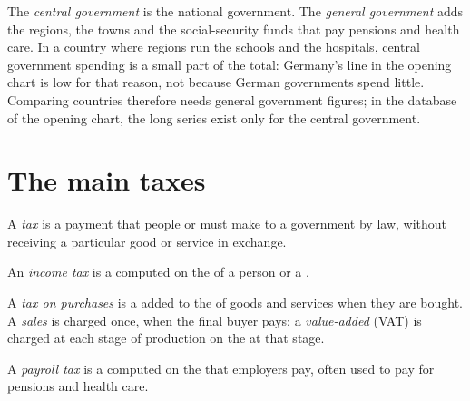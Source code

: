 \begin{measure}
The \emph{central government} is the national government. The \emph{general government} adds the
regions, the towns and the social-security funds that pay pensions and health care. In a country
where regions run the schools and the hospitals, central government spending is a small part of the
total: Germany's line in the opening chart is low for that reason, not because German governments
spend little. Comparing countries therefore needs general government figures; in the database of the
opening chart, the long series exist only for the central government.
\end{measure}

\section{The main taxes}

\begin{definition}[Tax]\label{def:g8:taxes-and-public-spending:tax}
A \emph{tax} is a payment that people or  must make to a government by law, without
receiving a particular good or service in exchange.
\end{definition}

\begin{definition}\label{def:g8:taxes-and-public-spending:income-tax}
An \emph{income tax} is a  computed on the  of a person or a .
\end{definition}

\begin{definition}\label{def:g8:taxes-and-public-spending:tax-on-purchases}
A \emph{tax on purchases} is a  added to the  of goods and services
when they are bought. A \emph{sales } is charged once, when the final buyer pays; a
\emph{value-added } (VAT) is charged at each stage of production on the  at that stage.
\end{definition}

\begin{definition}\label{def:g8:taxes-and-public-spending:payroll-tax}
A \emph{payroll tax} is a  computed on the  that employers pay, often used to
pay for pensions and health care.
\end{definition}


